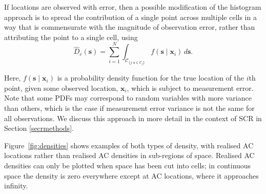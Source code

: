 \documentclass[useAMS,usenatbib,referee]{biom}
\begin{document}
If locations are observed with error, then a possible modification of the histogram approach is to spread the contribution of a single point across multiple cells in a way that is commensurate with the magnitude of observation error, rather than attributing the point to a single cell, using
\begin{equation}
  \widehat{D}_r(\bm{s}) = \sum_{i = 1}^N \int_{\mathcal{C}_{\{j: \bm{s} \in \mathcal{C}_j\}}}  f(\bm{s} \mid \bm{x}_i) \, d\bm{s}. \label{eq:realised-D-error}
\end{equation}

Here, $f(\bm{s} \mid \bm{x}_i)$ is a probability density function for the true location of the $i$th point, given some observed location, $\bm{x}_i$, which is subject to measurement error. Note that some PDFs may correspond to random variables with more variance than others, which is the case if measurement error variance is not the same for all observations. We discuss this approach in more detail in the context of SCR in Section \ref{secrmethods}.

Figure~\ref{fig:densities} shows examples of both types of density, with realised AC locations rather than realised AC densities in sub-regions of space. Realised AC densities can only be plotted when space has been cut into cells; in continuous space the density is zero everywhere except at AC locations, where it approaches infinity.
\end{document}
